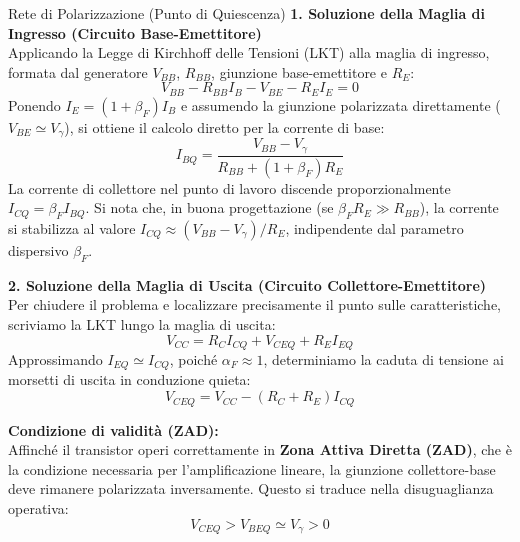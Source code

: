 \begin{esercizio}{Rete di Polarizzazione (Punto di Quiescenza)}
    \vspace{0.4cm}
    \textbf{1. Soluzione della Maglia di Ingresso (Circuito Base-Emettitore)} \\
    Applicando la Legge di Kirchhoff delle Tensioni (LKT) alla maglia di ingresso, formata dal generatore $V_{BB}$, $R_{BB}$, giunzione base-emettitore e $R_E$:
    \begin{equation}
        V_{BB} - R_{BB} I_B - V_{BE} - R_E I_E = 0
    \end{equation}
    Ponendo $I_E = (1+\beta_F)I_B$ e assumendo la giunzione polarizzata direttamente ($V_{BE} \simeq V_\gamma$), si ottiene il calcolo diretto per la corrente di base:
    \begin{equation}
        I_{BQ} = \frac{V_{BB} - V_\gamma}{R_{BB} + (1+\beta_F)R_E}
    \end{equation}
    La corrente di collettore nel punto di lavoro discende proporzionalmente $I_{CQ} = \beta_F I_{BQ}$. Si nota che, in buona progettazione (se $\beta_F R_E \gg R_{BB}$), la corrente si stabilizza al valore $I_{CQ} \approx (V_{BB} - V_\gamma)/R_E$, indipendente dal parametro dispersivo $\beta_F$.

    \vspace{0.4cm}
    \textbf{2. Soluzione della Maglia di Uscita (Circuito Collettore-Emettitore)} \\
    Per chiudere il problema e localizzare precisamente il punto sulle caratteristiche, scriviamo la LKT lungo la maglia di uscita:
    \begin{equation}
        V_{CC} = R_C I_{CQ} + V_{CEQ} + R_E I_{EQ}
    \end{equation}
    Approssimando $I_{EQ} \simeq I_{CQ}$, poiché $\alpha_F \approx 1$, determiniamo la caduta di tensione ai morsetti di uscita in conduzione quieta:
    \begin{equation}
        V_{CEQ} = V_{CC} - (R_C+R_E)I_{CQ}
    \end{equation}
\end{esercizio}

\vspace{0.3cm}
\noindent \textbf{Condizione di validità (ZAD):} \\
Affinché il transistor operi correttamente in \textbf{Zona Attiva Diretta (ZAD)}, che è la condizione necessaria per l'amplificazione lineare, la giunzione collettore-base deve rimanere polarizzata inversamente. Questo si traduce nella disuguaglianza operativa:
\begin{equation}
    V_{CEQ} > V_{BEQ} \simeq V_\gamma > 0
\end{equation}

